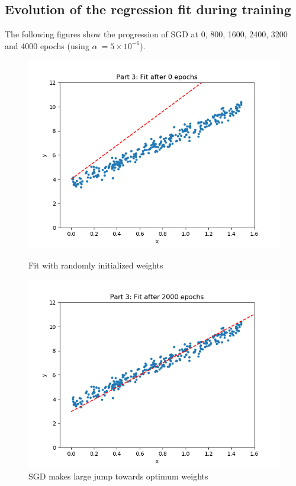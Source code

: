 \documentclass[paper=a4, fontsize=11pt]{scrartcl} %
\numberwithin{equation}{section} %
\numberwithin{figure}{section} %
\numberwithin{table}{section} %
\begin{document}
\subsection{Evolution of the regression fit during training}
The following figures show the progression of SGD at 0, 800, 1600, 2400, 3200 and 4000 epochs (using \(\alpha\ = 5\times10^{-6}\)).

\begin{figure}[H]
    \includegraphics[width=\linewidth]{q2p31.png}
    \caption{Fit with randomly initialized weights}
    \label{fig:q2p31}
    \includegraphics[width=\linewidth]{q2p32.png}
    \caption{SGD makes large jump towards optimum weights}
    \label{fig:q2p32}
\end{figure}
\end{document}
